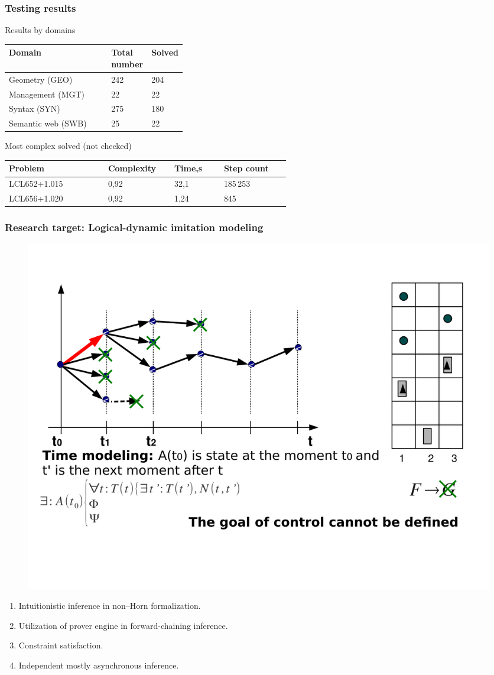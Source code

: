 \documentclass[aspectratio=169]{beamer}
\begin{document}
\begin{frame}
  \frametitle{Testing results}
  \begin{block}{Results by domains}
    \begin{longtable}[H]{|l|p{0.2\linewidth}|p{0.15\linewidth}|}
\hline
\textbf{Domain} & \textbf{Total number} & \textbf{Solved} \\
\hline
Geometry (GEO) & 242 & 204 \\
\hline
Management (MGT) & 22 & 22 \\
\hline
Syntax (SYN) & 275 & 180 \\
\hline
Semantic web (SWB) & 25 & 22 \\
\hline
\end{longtable}
\end{block}
\begin{block}{Most complex solved (not checked)}
  \begin{longtable}{|p{0.3\linewidth}|p{0.2\linewidth}|p{0.15\linewidth}|p{0.2\linewidth}|}
\hline
\textbf{Problem} & \textbf{Complexity} & \textbf{Time,s} & \textbf{Step count} \\
\hline
LCL652+1.015 & 0,92 & 32,1 & 185\,{}253 \\
\hline
LCL656+1.020 & 0,92 & 1,24 & 845 \\
\hline
\end{longtable}
\end{block}
\end{frame}

\begin{frame}

\frametitle{Research target: Logical-dynamic imitation modeling}

\begin{figure}
\includegraphics[width=0.7\linewidth]{pics/elevbetter}
\end{figure}
\vspace{-4em}
\begin{enumerate}\small
\item Intuitionistic inference in non--Horn formalization.
\item Utilization of prover engine in forward-chaining inference.
\item Constraint satisfaction.
\item Independent mostly asynchronous inference.
\end{enumerate}
\end{frame}
\end{document}
